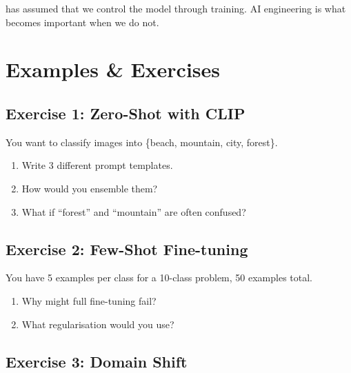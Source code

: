 
 has assumed that we control the model through training. AI engineering is what becomes important when we do not.

\vspace{2.5em}



\newpage
\section{Examples \& Exercises}

\subsection{Exercise 1: Zero-Shot with CLIP}

You want to classify images into \{beach, mountain, city, forest\}.

\begin{enumerate}
    \item Write 3 different prompt templates.
    \item How would you ensemble them?
    \item What if ``forest'' and ``mountain'' are often confused?
\end{enumerate}

\subsection{Exercise 2: Few-Shot Fine-tuning}

You have 5 examples per class for a 10-class problem, 50 examples total.

\begin{enumerate}
    \item Why might full fine-tuning fail?
    \item What regularisation would you use?
\end{enumerate}

\subsection{Exercise 3: Domain Shift}


